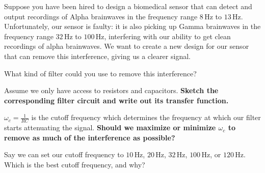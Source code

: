 

Suppose you have been hired to design a biomedical sensor that can detect and output recordings of Alpha brainwaves in the frequency range $8 \, \text{Hz}$ to $13 \, \text{Hz}$. 
Unfortunately, our sensor is faulty: it is also picking up Gamma brainwaves in the frequency range $32 \, \text{Hz}$ to $100 \, \text{Hz}$, interfering with our ability to get clean recordings of alpha brainwaves. 
We want to create a new design for our sensor that can remove this interference, giving us a clearer signal.

\begin{enumerate}
  \qitem What kind of filter could you use to remove this interference? 
  
  
  \qitem Assume we only have access to resistors and capacitors. \textbf{Sketch the corresponding filter circuit and write out its transfer function.} 


  \qitem $\omega_{c} = \frac{1}{RC}$ is the cutoff frequency which determines the frequency at which our filter starts attenuating the signal. \textbf{Should we maximize or minimize $\omega_{c}$ to remove as much of the interference as possible?}


  \qitem Say we can set our cutoff frequency to $10 \, \text{Hz}$, $20 \, \text{Hz}$, $32 \, \text{Hz}$, $100 \, \text{Hz}$, or $120 \, \text{Hz}$. Which is the best cutoff frequency, and why?



\end{enumerate}
